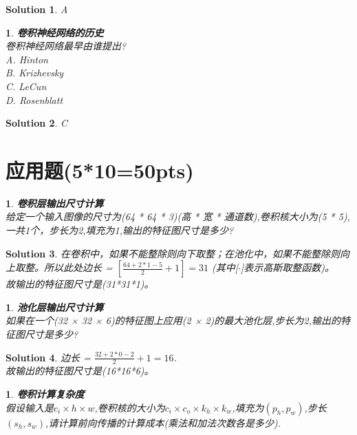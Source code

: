 \documentclass{article}
\theoremstyle{Problem}
\newtheorem{prob}[subsection]{}
\theoremstyle{Solution}
\newtheorem*{sol}{Solution}
\begin{document}
	\begin{sol}
		A\\
	\end{sol}
	
	\begin{prob}
		\textbf{卷积神经网络的历史}\\
		卷积神经网络最早由谁提出?\\
		A. Hinton \\
		B. Krizhevsky \\
		C. LeCun \\ 
		D. Rosenblatt
	\end{prob}
	
	\begin{sol}
		C\\
	\end{sol}
	
	
	\section{应用题(5*10=50pts)}
	
	
	\begin{prob}
		\textbf{卷积层输出尺寸计算}\\
		给定一个输入图像的尺寸为(64 * 64 * 3)(高 * 宽 * 通道数),卷积核大小为(5 * 5),一共1个，步长为2,填充为1,输出的特征图尺寸是多少?
	\end{prob}
	
	\begin{sol}
		在卷积中，如果不能整除则向下取整；在池化中，如果不能整除则向上取整。所以此处边长 = $[\frac{64+2*1-5}{2}+1] = 31$ (其中[$\cdot$]表示高斯取整函数)。\\
		故输出的特征图尺寸是(31*31*1)。\\
	\end{sol}
	
	\begin{prob}
		\textbf{池化层输出尺寸计算}\\
		如果在一个(32 × 32 × 6)的特征图上应用(2 × 2)的最大池化层,步长为2,输出的特征图尺寸是多少?
	\end{prob}
	
	\begin{sol}
		边长 = $\frac{32+2*0-2}{2}+1 = 16$.\\
		故输出的特征图尺寸是(16*16*6)。\\
	\end{sol}
	
	\begin{prob}
		\textbf{卷积计算复杂度}\\
		假设输入是\( c_i \times h \times w \),卷积核的大小为\( c_i \times c_o \times k_h \times k_w \),填充为\( (p_h, p_w) \),步长\( (s_h, s_w) \),请计算前向传播的计算成本(乘法和加法次数各是多少).
	\end{prob}
	
\end{document}
